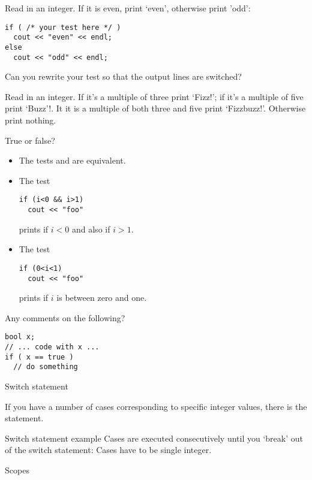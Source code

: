 \begin{exercise}
  \label{ex:oddeven}
  Read in an integer. If it is even, print `even', otherwise print
  'odd':
\begin{verbatim}
if ( /* your test here */ ) 
  cout << "even" << endl;
else
  cout << "odd" << endl;
\end{verbatim}
Can you rewrite your test so that the output lines are switched?
\end{exercise}

\begin{exercise}
  \label{ex:fizzbuzz}
  Read in an integer. If it's a multiple of three print `Fizz!';
  if it's a multiple of five print `Buzz'!. It it is 
  a multiple of both three and five print `Fizzbuzz!'. Otherwise
  print nothing.
\end{exercise}

\begin{review}
  \label{q:if}
  True or false?
  \begin{itemize}
  \item The tests  and  are equivalent.
  \item The test
\begin{verbatim}
if (i<0 && i>1) 
  cout << "foo"
\end{verbatim}
prints  if
    $i<0$ and also if $i>1$.
  \item The test 
\begin{verbatim}
if (0<i<1)
  cout << "foo"
\end{verbatim}
prints  if $i$ is
    between zero and one.
  \end{itemize}
  Any comments on the following?
\begin{verbatim}
bool x;
// ... code with x ...
if ( x == true )
  // do something
\end{verbatim}
\end{review}

 {Switch statement}

If you have a number of cases corresponding to specific integer
values, there is the  statement.

\begin{block}{Switch statement example}
  \label{sl:switch}
  Cases are executed consecutively until you `break' out of the switch
  statement:
  Cases have to be single integer.
\end{block}

 {Scopes}

